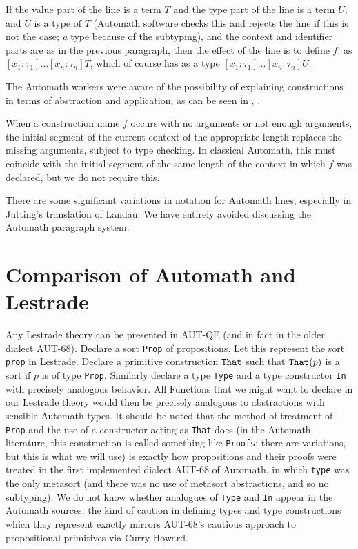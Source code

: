 \documentclass[submission,copyright,creativecommons]{eptcs}
\begin{document}
If the value part of the line is a term $T$ and the type part of the line is a term $U$, and $U$ is a type of $T$ (Automath software checks this and rejects the line if this is not the case; {\em a\/} type because of the subtyping), and the context and identifier parts are as in the previous paragraph,  then the effect of the line is to define $f!$ as $[x_1:\tau_1]\ldots[x_n:\tau_n]T$, which of course has as a type $[x_1:\tau_1]\ldots[x_n:\tau_n]U$.

The Automath workers were aware of the possibility of explaining constructions in terms of abstraction and application, as can be seen in \cite{autsl}, \cite{autlambda}.

When a construction name $f$ occurs with no arguments or not enough arguments, the initial segment of the current context of the appropriate length replaces the missing arguments, subject to type checking.  In classical Automath, this must coincide with the initial segment of the same length of the context in which $f$ was declared, but we do not require this.

There are some significant variations in notation for Automath lines, especially in Jutting's translation of Landau.  We have entirely avoided discussing the Automath paragraph system.

\section{Comparison of Automath and Lestrade}

Any Lestrade theory can be presented in AUT-QE (and in fact in the older dialect AUT-68).  Declare a sort {\tt Prop} of propositions.  Let this represent the
sort {\tt prop} in Lestrade.  Declare a primitive construction ${\tt That}$ such that ${\tt That}(p)$ is a sort if $p$ is of type {\tt Prop}.
Similarly declare a type {\tt Type} and a type constructor {\tt In} with precisely analogous behavior.  All Functions that we might want to declare
in our Lestrade theory would then be precisely analogous to abstractions with sensible Automath types.  It should be noted that the method of treatment of {\tt Prop}
and the use of a constructor acting as {\tt That} does (in the Automath literature, tbis construction is called something like {\tt Proofs}; there are variations, but this is what we will use) is exactly how propositions
and their proofs were treated in the first implemented dialect AUT-68 of Automath, in which {\tt type} was the only metasort (and there was no use
of metasort abstractions, and so no subtyping).  We do not know whether analogues of {\tt Type} and {\tt In} appear in the Automath sources:  the kind of caution in defining types and type constructions which they represent exactly mirrors AUT-68's cautious approach to propositional primitives via Curry-Howard.
\end{document}
